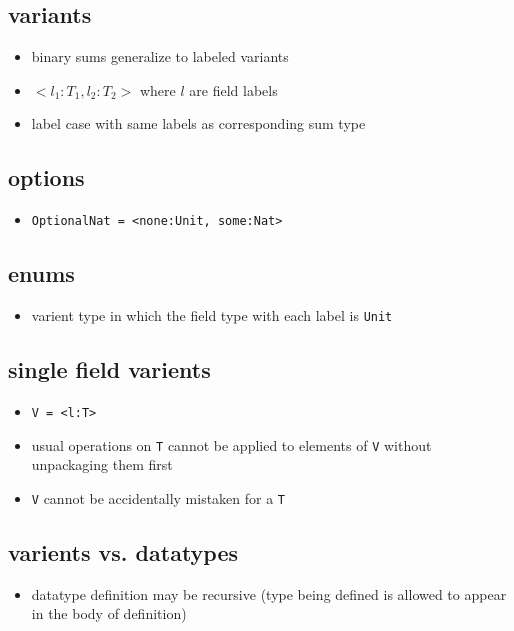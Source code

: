 \documentclass[11pt]{article}
\begin{document}
\subsection{variants}
\label{sec:orgc5665cc}
\begin{itemize}
\item binary sums generalize to labeled variants
\item \(<l_1:T_1, l_2:T_2>\) where \(l\) are field labels
\item label case with same labels as corresponding sum type
\end{itemize}

\subsection{options}
\label{sec:org1cbd71e}
\begin{itemize}
\item \texttt{OptionalNat = <none:Unit, some:Nat>}
\end{itemize}

\subsection{enums}
\label{sec:orga383d90}
\begin{itemize}
\item varient type in which the field type with each label is \texttt{Unit}
\end{itemize}
\subsection{single field varients}
\label{sec:org58c09fc}
\begin{itemize}
\item \texttt{V = <l:T>}
\item usual operations on \texttt{T} cannot be applied to elements of \texttt{V} without unpackaging them first
\item \texttt{V} cannot be accidentally mistaken for a \texttt{T}
\end{itemize}

\subsection{varients vs. datatypes}
\label{sec:org738588c}
\begin{itemize}
\item datatype definition may be recursive (type being defined is allowed to appear in the body of definition)
\end{itemize}
\end{document}
